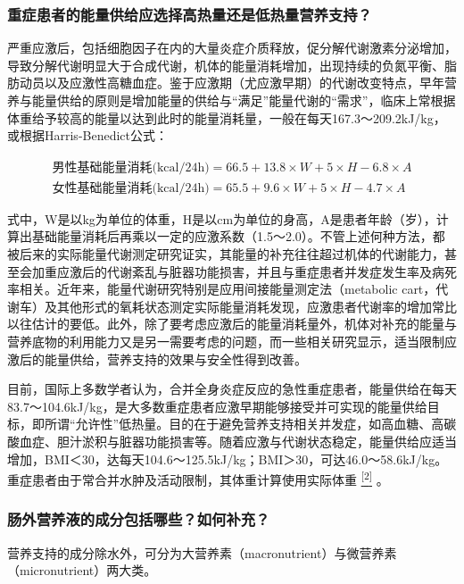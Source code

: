 \subsubsection{重症患者的能量供给应选择高热量还是低热量营养支持？}

严重应激后，包括细胞因子在内的大量炎症介质释放，促分解代谢激素分泌增加，导致分解代谢明显大于合成代谢，机体的能量消耗增加，出现持续的负氮平衡、脂肪动员以及应激性高糖血症。鉴于应激期（尤应激早期）的代谢改变特点，早年营养与能量供给的原则是增加能量的供给与“满足”能量代谢的“需求”，临床上常根据体重给予较高的能量以达到此时的能量消耗量，一般在每天167.3～209.2kJ/kg，或根据Harris-Benedict公式：

\[
  \begin{array}{l}
\text{男性基础能量消耗(kcal/24h)}=66.5+13.8\times W+5\times H-6.8\times A  \\
\text{女性基础能量消耗(kcal/24h)}=65.5+9.6\times W+5\times H-4.7\times A  
  \end{array}
\]

式中，W是以kg为单位的体重，H是以cm为单位的身高，A是患者年龄（岁），计算出基础能量消耗后再乘以一定的应激系数（1.5～2.0）。不管上述何种方法，都被后来的实际能量代谢测定研究证实，其能量的补充往往超过机体的代谢能力，甚至会加重应激后的代谢紊乱与脏器功能损害，并且与重症患者并发症发生率及病死率相关。近年来，能量代谢研究特别是应用间接能量测定法（metabolic
cart，代谢车）及其他形式的氧耗状态测定实际能量消耗发现，应激患者代谢率的增加常比以往估计的要低。此外，除了要考虑应激后的能量消耗量外，机体对补充的能量与营养底物的利用能力又是另一需要考虑的问题，而一些相关研究显示，适当限制应激后的能量供给，营养支持的效果与安全性得到改善。

目前，国际上多数学者认为，合并全身炎症反应的急性重症患者，能量供给在每天83.7～104.6kJ/kg，是大多数重症患者应激早期能够接受并可实现的能量供给目标，即所谓“允许性”低热量。目的在于避免营养支持相关并发症，如高血糖、高碳酸血症、胆汁淤积与脏器功能损害等。随着应激与代谢状态稳定，能量供给应适当增加，BMI＜30，达每天104.6～125.5kJ/kg；BMI＞30，可达46.0～58.6kJ/kg。重症患者由于常合并水肿及活动限制，其体重计算使用实际体重
\protect\hyperlink{text00028.htmlux5cux23ch2-27}{\textsuperscript{{[}2{]}}}
。

\subsubsection{肠外营养液的成分包括哪些？如何补充？}

营养支持的成分除水外，可分为大营养素（macronutrient）与微营养素（micronutrient）两大类。

